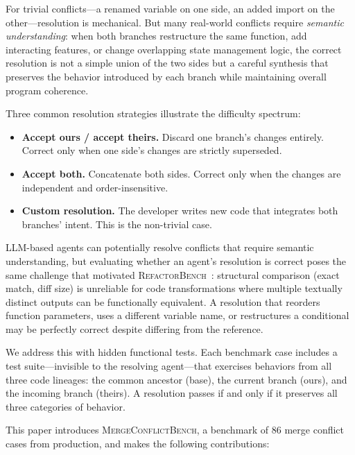 \documentclass[11pt,a4paper]{article}
\begin{document}
For trivial conflicts---a renamed variable on one side, an added import on the other---resolution is mechanical. But many real-world conflicts require \emph{semantic understanding}: when both branches restructure the same function, add interacting features, or change overlapping state management logic, the correct resolution is not a simple union of the two sides but a careful synthesis that preserves the behavior introduced by each branch while maintaining overall program coherence.

Three common resolution strategies illustrate the difficulty spectrum:

\begin{itemize}[leftmargin=2em]
\item \textbf{Accept ours / accept theirs.} Discard one branch's changes entirely. Correct only when one side's changes are strictly superseded.
\item \textbf{Accept both.} Concatenate both sides. Correct only when the changes are independent and order-insensitive.
\item \textbf{Custom resolution.} The developer writes new code that integrates both branches' intent. This is the non-trivial case.
\end{itemize}

LLM-based agents can potentially resolve conflicts that require semantic understanding, but evaluating whether an agent's resolution is correct poses the same challenge that motivated \textsc{RefactorBench}~\citep{chen2025refactorbench}: structural comparison (exact match, diff size) is unreliable for code transformations where multiple textually distinct outputs can be functionally equivalent. A resolution that reorders function parameters, uses a different variable name, or restructures a conditional may be perfectly correct despite differing from the reference.

We address this with hidden functional tests. Each benchmark case includes a test suite---invisible to the resolving agent---that exercises behaviors from all three code lineages: the common ancestor (base), the current branch (ours), and the incoming branch (theirs). A resolution passes if and only if it preserves all three categories of behavior.

This paper introduces \textsc{MergeConflictBench}, a benchmark of 86 merge conflict cases from production, and makes the following contributions:
\end{document}
